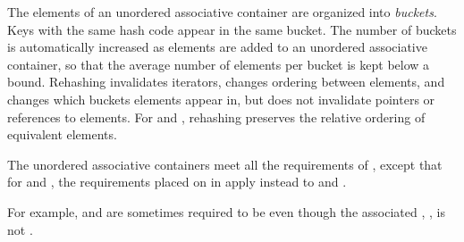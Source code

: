 \pnum
{}%
%
The elements of an unordered associative container are organized into
\textit{buckets}.  Keys with the same hash code appear in the same
bucket.  The number of buckets is automatically increased as elements
are added to an unordered associative container, so that the average
number of elements per bucket is kept below a bound.  Rehashing
invalidates iterators, changes ordering between elements, and changes
which buckets elements appear in, but does not invalidate pointers or
references to elements. For  and
, rehashing preserves the relative ordering of
equivalent elements.

\pnum
The unordered associative containers meet all the requirements of
, except that for
 and , the requirements placed on 
in  apply instead to 
and .
\begin{note}
For example,  and 
are sometimes required to be  even though the associated
, , is not
.
\end{note}

